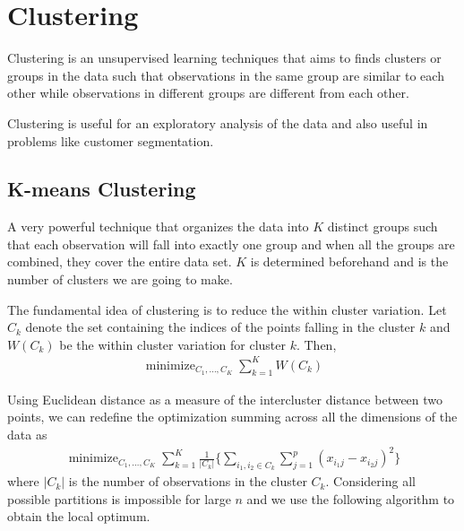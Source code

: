 \documentclass[11pt, a4paper]{article}
\DeclareMathOperator*{\minimize}{minimize}
\begin{document}
    \section{Clustering}
    Clustering is an unsupervised learning techniques that aims to finds clusters or groups in the data such that observations in the same group are similar to each other while observations in different groups are different from each other.\newline

    Clustering is useful for an exploratory analysis of the data and also useful in problems like customer segmentation.

    \subsection{K-means Clustering}
    A very powerful technique that organizes the data into $K$ distinct groups such that each observation will fall into exactly one group and when all the groups are combined, they cover the entire data set. $K$ is determined beforehand and is the number of clusters we are going to make.\newline

    The fundamental idea of clustering is to reduce the within cluster variation. Let $C_{k}$ denote the set containing the indices of the points falling in the cluster $k$ and $W(C_{k})$ be the within cluster variation for cluster $k$. Then,
    \begin{align*}
        \minimize_{C_{1},\ldots,C_{K}} \sum_{k=1}^{K} W(C_{k})
    \end{align*}

    Using Euclidean distance as a measure of the intercluster distance between two points, we can redefine the optimization summing across all the dimensions of the data as
    \begin{align*}
        \minimize_{C_{1},\ldots,C_{K}} \sum_{k=1}^{K} \frac{1}{\vert C_{k} \vert} \bigg\{\sum_{i_{1}, i_{2} \in C_{k}} \sum_{j=1}^{p} (x_{i_{1}j} - x_{i_{2}j})^{2} \bigg \}
    \end{align*}
    where $\vert C_{k} \vert$ is the number of observations in the cluster $C_{k}$. Considering all possible partitions is impossible for large $n$ and we use the following algorithm to obtain the local optimum.


\end{document}
